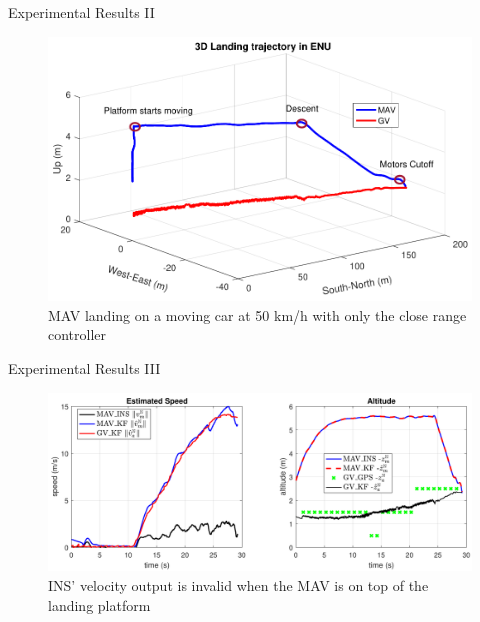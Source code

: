 
\begin{frame}{Experimental Results II}
	\begin{figure}
		\includegraphics[width=0.8\paperwidth]{figures/landing.pdf} \\
		MAV landing on a moving car at 50 km/h with only the close range controller%
	\end{figure}
\end{frame}


\begin{frame}{Experimental Results III}
	\begin{figure}
		\includegraphics[width=0.8\paperwidth]{figures/landing_motion.pdf} \\
		INS' velocity output is invalid when the MAV is on top of the landing platform%
	\end{figure}
\end{frame}

